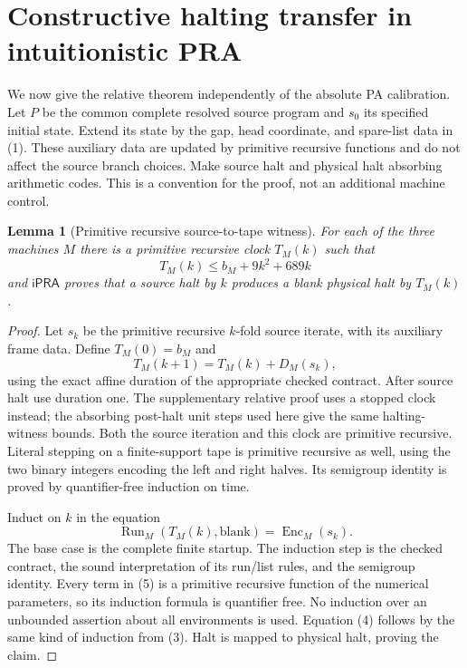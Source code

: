 \documentclass[11pt,a4paper]{article}
\newtheorem{lemma}[theorem]{Lemma}
\newcommand{\ipra}{\mathsf{iPRA}}
\newcommand{\Run}{\operatorname{Run}}
\newcommand{\Enc}{\operatorname{Enc}}
\begin{document}
\section{Constructive halting transfer in intuitionistic PRA}
\label{sec:ipra}

We now give the relative theorem independently of the absolute PA
calibration. Let $P$ be the common complete resolved source program and
$s_0$ its specified initial state. Extend its state by the gap, head
coordinate, and spare-list data in (1). These auxiliary data are updated
by primitive recursive functions and do not affect the source branch
choices. Make source halt and physical halt absorbing arithmetic codes.
This is a convention for the proof, not an additional machine control.

\begin{lemma}[Primitive recursive source-to-tape witness]
For each of the three machines $M$ there is a primitive recursive clock
$T_M(k)$ such that
\[
T_M(k)\le b_M+9k^2+689k
\]
and $\ipra$ proves that a source halt by $k$ produces a blank physical
halt by $T_M(k)$.
\end{lemma}
\begin{proof}
Let $s_k$ be the primitive recursive $k$-fold source iterate, with its
auxiliary frame data. Define $T_M(0)=b_M$ and
\[
T_M(k+1)=T_M(k)+D_M(s_k),
\]
using the exact affine duration of the appropriate checked contract.
After source halt use duration one. The supplementary relative proof uses a stopped clock instead; the absorbing post-halt unit steps used here give the same halting-witness bounds. Both the source iteration and this
clock are primitive recursive. Literal stepping on a finite-support tape
is primitive recursive as well, using the two binary integers encoding
the left and right halves. Its semigroup identity is proved by
quantifier-free induction on time.

Induct on $k$ in the equation
\[
 \Run_M(T_M(k),\mathrm{blank})=\Enc_M(s_k).          \tag{5}
\]
The base case is the complete finite startup. The induction step is the
checked contract, the sound interpretation of its run/list rules, and
the semigroup identity. Every term in (5) is a primitive recursive
function of the numerical parameters, so its induction formula is
quantifier free. No induction over an unbounded assertion about all
environments is used. Equation (4) follows by the same kind of induction
from (3). Halt is mapped to physical halt, proving the claim.
\end{proof}
\end{document}

